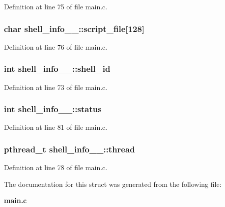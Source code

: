 Definition at line 75 of file main.c.
\subsubsection[{script\_\-file}]{\setlength{\rightskip}{0pt plus 5cm}char {\bf shell\_\-info\_\-\_\-::script\_\-file}[128]}\label{structshell__info_____ad9ac636d3c2d56701330c7230414225e}


Definition at line 76 of file main.c.
\subsubsection[{shell\_\-id}]{\setlength{\rightskip}{0pt plus 5cm}int {\bf shell\_\-info\_\-\_\-::shell\_\-id}}\label{structshell__info_____aa012000f1d1c2d8f85371ceb27a8eb01}


Definition at line 73 of file main.c.
\subsubsection[{status}]{\setlength{\rightskip}{0pt plus 5cm}int {\bf shell\_\-info\_\-\_\-::status}}\label{structshell__info_____a519bd295fdd3957fcfebbec9d43b868a}


Definition at line 81 of file main.c.
\subsubsection[{thread}]{\setlength{\rightskip}{0pt plus 5cm}pthread\_\-t {\bf shell\_\-info\_\-\_\-::thread}}\label{structshell__info_____ad82964544141706aa86f5a7362f37314}


Definition at line 78 of file main.c.

The documentation for this struct was generated from the following file:\begin{DoxyCompactItemize}
\item 
{\bf main.c}\end{DoxyCompactItemize}
